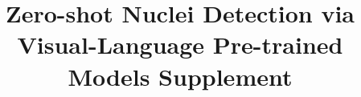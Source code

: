 \documentclass[runningheads]{llncs}
\begin{document}
\title{Zero-shot Nuclei Detection via Visual-Language Pre-trained Models \textemdash Supplement}
%
%
%
%
%
%
\end{document}
